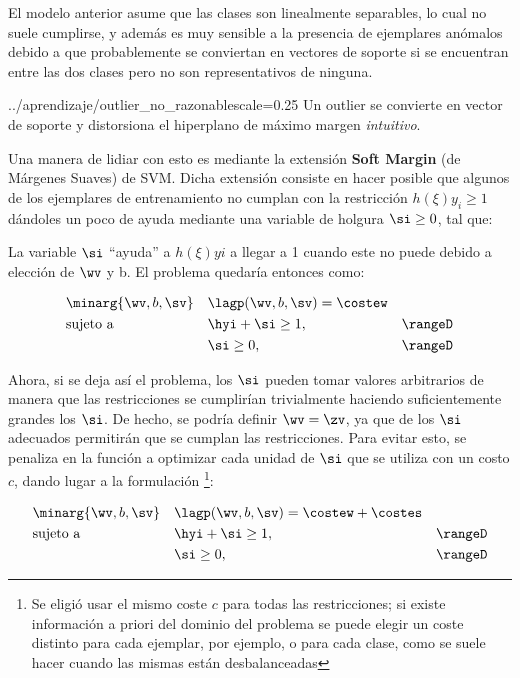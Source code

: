 El modelo anterior asume que las clases son linealmente separables, lo cual no suele cumplirse, y además es muy sensible a la presencia de ejemplares anómalos debido a que probablemente se conviertan en vectores de soporte si se encuentran entre las dos clases pero no son representativos de ninguna.


{../aprendizaje/outlier_no_razonable}{scale=0.25}{ Un outlier se convierte en vector de soporte y distorsiona el hiperplano de máximo margen \textit{intuitivo}.}

Una manera de lidiar con esto es mediante la extensión \textbf{Soft Margin} (de Márgenes Suaves) de SVM. Dicha extensión consiste en hacer posible que algunos de los ejemplares de entrenamiento no cumplan con la restricción $h(\xi) y_i \geq 1$ dándoles un poco de ayuda mediante una variable de holgura $\si \geq 0$, tal que:



La variable $\si$ ``ayuda'' a $h(\xi) yi$ a llegar a 1 cuando este no puede debido a elección de $\wv$ y b. El problema quedaría entonces como:


\begin{equation*}
\begin{aligned}
& \minarg{\wv,b,\sv}
& &  \lagp(\wv,b,\sv)= \costew\\
& \text{sujeto a}
& &  \hyi + \si \geq 1, \; & \rangeD\\ 
& & & \si \geq 0, \; & \rangeD
\end{aligned}
\end{equation*}


Ahora, si se deja así el problema, los $\si$ pueden tomar valores arbitrarios de manera que las restricciones se cumplirían trivialmente haciendo suficientemente grandes los $\si$. De hecho, se podría definir $\wv = \zv$, ya que de los $\si$ adecuados permitirán que se cumplan las restricciones. Para evitar esto, se penaliza en la función a optimizar cada unidad de $\si$ que se utiliza con un costo $c$, dando lugar a la formulación \footnote{Se eligió usar el mismo coste $c$ para todas las restricciones; si existe información a priori del dominio del problema se puede elegir un coste distinto para cada ejemplar, por ejemplo, o para cada clase, como se suele hacer cuando las mismas están desbalanceadas}:


\begin{equation*}
\begin{aligned}
& \minarg{\wv,b,\sv}
& &  \lagp(\wv,b,\sv)= \costew + \costes \\
& \text{sujeto a}
& &  \hyi + \si \geq 1, \; & \rangeD\\ 
& & & \si \geq 0, \; & \rangeD
\end{aligned}
\end{equation*}

